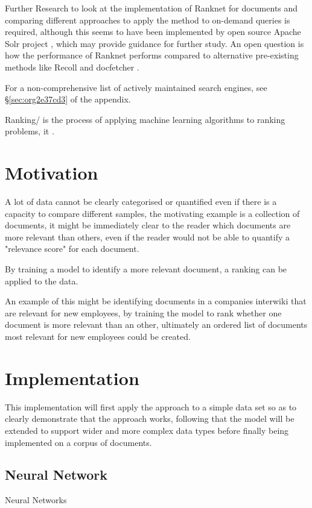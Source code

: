 \documentclass[a4paper,11pt,twoside]{article}
\begin{document}
Further Research to look at the implementation of Ranknet for
documents and comparing different approaches to apply the method to
on-demand queries is required, although this seems to have been
implemented by open source Apache Solr project
\cite{michaelalcornIntroductionMachinelearnedRanking}, which may
provide guidance for further study. An open question is how the
performance of Ranknet performs compared to alternative pre-existing
methods like Recoll \cite{jean-francoisdockesRecollUserManual} and
docfetcher \cite{docfetcherdevelopmentteamDocFetcherFastDocument}.

For a non-comprehensive list of actively maintained search engines,
see \S \ref{sec:org2e37cd3} of the appendix.

Ranking/ is the process of applying machine learning algorithms to
ranking problems, it .
\section{Motivation}
\label{sec:org4da2811}
A lot of data cannot be clearly categorised or quantified even if there
is a capacity to compare different samples, the motivating example
is a collection of documents, it might be immediately clear to the
reader which documents are more relevant than others, even if the
reader would not be able to quantify a "relevance score" for each
document.

By training a model to identify a more relevant document, a ranking
can be applied to the data.

An example of this might be identifying documents in a companies
interwiki that are relevant for new employees, by training the model
to rank whether one document is more relevant than an other,
ultimately an ordered list of documents most relevant for new
employees could be created.
\section{Implementation}
\label{sec:orga1b4552}
This implementation will first apply the approach to a simple data
set so as to clearly demonstrate that the approach works, following
that the model will be extended to support wider and more complex
data types before finally being implemented on a corpus of documents.

\subsection{Neural Network}
\label{sec:orgaf25214}
Neural Networks \cite{pictonNeuralNetworks1994}
\end{document}
